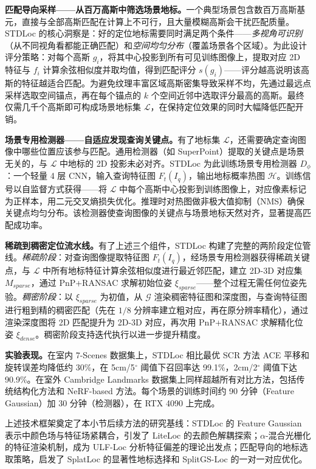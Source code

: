 \textbf{匹配导向采样——从百万高斯中筛选场景地标。}一个典型场景包含数百万高斯基元，直接与全部高斯匹配在计算上不可行，且大量模糊高斯会干扰匹配质量。STDLoc 的核心洞察是：好的定位地标需要同时满足两个条件——\emph{多视角可识别}（从不同视角看都能正确匹配）和\emph{空间均匀分布}（覆盖场景各个区域）。为此设计评分策略：对每个高斯 $g_i$，将其中心投影到所有可见训练图像上，提取对应 2D 特征与 $f_i$ 计算余弦相似度并取均值，得到匹配评分 $s(g_i)$——评分越高说明该高斯的特征越适合匹配。为避免纹理丰富区域高斯密集导致采样不均，先通过最远点采样选取空间锚点，再在每个锚点的 $k$ 个空间近邻中选取评分最高的高斯。最终仅需几千个高斯即可构成场景地标集 $\mathcal{L}$，在保持定位效果的同时大幅降低匹配开销。

\textbf{场景专用检测器——自适应发现查询关键点。}有了地标集 $\mathcal{L}$，还需要确定查询图像中哪些位置应该参与匹配。通用检测器（如 SuperPoint）提取的关键点是场景无关的，与 $\mathcal{L}$ 中地标的 2D 投影未必对齐。STDLoc 为此训练场景专用检测器 $D_\phi$：一个轻量 4 层 CNN，输入查询特征图 $F_t(I_q)$，输出地标概率热图 $\mathcal{H}$。训练信号以自监督方式获得——将 $\mathcal{L}$ 中每个高斯中心投影到训练图像上，对应像素标记为正样本，用二元交叉熵损失优化。推理时对热图做非极大值抑制（NMS）确保关键点均匀分布。该检测器使查询图像的关键点与场景地标天然对齐，显著提高匹配成功率。

\textbf{稀疏到稠密定位流水线。}有了上述三个组件，STDLoc 构建了完整的两阶段定位管线。\emph{稀疏阶段}：对查询图像提取特征图 $F_t(I_q)$，经场景专用检测器获得稀疏关键点，与 $\mathcal{L}$ 中所有地标特征计算余弦相似度进行最近邻匹配，建立 2D-3D 对应集 $M_{sparse}$，通过 PnP+RANSAC 求解初始位姿 $\xi_{sparse}$——整个过程无需任何位姿先验。\emph{稠密阶段}：以 $\xi_{sparse}$ 为初值，从 $\mathcal{G}$ 渲染稠密特征图和深度图，与查询特征图进行粗到精的稠密匹配（先在 $1/8$ 分辨率建立粗对应，再在原分辨率精化），通过渲染深度图将 2D 匹配提升为 2D-3D 对应，再次用 PnP+RANSAC 求解精化位姿 $\xi_{dense}$。稠密阶段支持迭代执行以进一步提升精度。

\textbf{实验表现。}在室内 7-Scenes 数据集上，STDLoc 相比最优 SCR 方法 ACE 平移和旋转误差均降低约 30\%，在 5cm/5$^\circ$ 阈值下召回率达 99.1\%，2cm/2$^\circ$ 阈值下达 90.9\%。在室外 Cambridge Landmarks 数据集上同样超越所有对比方法，包括传统结构化方法和 NeRF-based 方法。每个场景的训练时间约 90 分钟（Feature Gaussian）加 30 分钟（检测器），在 RTX 4090 上完成。

上述技术框架奠定了本小节后续方法的研究基线：STDLoc 的 Feature Gaussian 表示中颜色场与特征场紧耦合，引发了 LiteLoc 的去颜色解耦探索；$\alpha$-混合光栅化的特征渲染机制，成为 ULF-Loc 分析特征偏差的理论出发点；匹配导向的地标选取策略，启发了 SplatLoc 的显著性地标选择和 SplitGS-Loc 的一对一对应优化。

